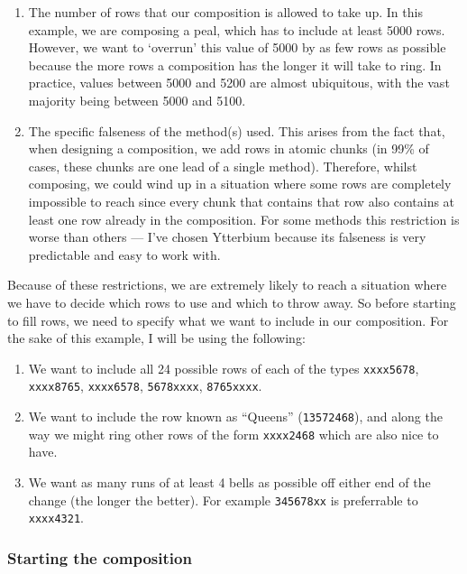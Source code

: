 \documentclass[12pt]{article}
\newcommand{\row}[1]{\texttt{#1}}
\begin{document}
\begin{enumerate}
    \item The number of rows that our composition is allowed to take up.  In this example, we are
        composing a peal, which has to include at least 5000 rows.  However, we want to `overrun'
        this value of 5000 by as few rows as possible because the more rows a composition has the
        longer it will take to ring.  In practice, values between 5000 and 5200 are almost ubiquitous,
        with the vast majority being between 5000 and 5100.
    \item The specific falseness of the method(s) used.  This arises from the fact that, when designing
        a composition, we add rows in
        atomic chunks (in 99\% of cases, these chunks are one lead of a single method).  Therefore,
        whilst composing, we could wind up in a situation where some rows are completely
        impossible to reach since every chunk that contains that row also contains at least one row
        already in the composition.  For some methods this restriction is worse than others --- I've
        chosen Ytterbium because its falseness is very predictable and easy to work with.
\end{enumerate}

\noindent Because of these restrictions, we are extremely likely to reach a situation where we have
to decide which rows to use and which to throw away.  So before starting to fill rows, we need to
specify what we want to include in our composition.  For the sake of this example, I will be using
the following:

\begin{enumerate}
    \item We want to include all 24 possible rows of each of the types \row{xxxx5678}, \row{xxxx8765},
        \row{xxxx6578}, \row{5678xxxx}, \row{8765xxxx}.
    \item We want to include the row known as ``Queens'' (\row{13572468}), and along the way we might
        ring other rows of the form \row{xxxx2468} which are also nice to have.
    \item We want as many runs of at least 4 bells as possible off either end of the change
        (the longer the better).  For example \row{345678xx} is preferrable to \row{xxxx4321}.
\end{enumerate}

\subsubsection{Starting the composition}
\end{document}
